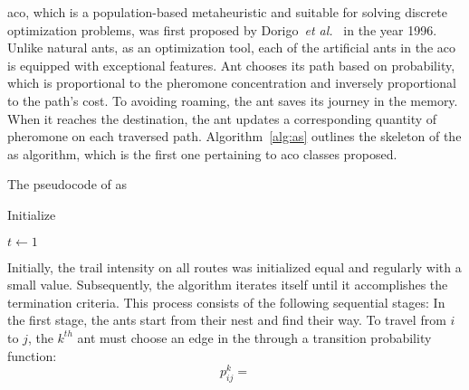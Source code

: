 \acrfull{aco}, which is a population-based metaheuristic and suitable for solving discrete optimization problems, was first proposed by Dorigo~\textit{et al.}~\cite{dorigo1996ant} in the year 1996. Unlike natural ants, as an optimization tool, each of the artificial ants in the \gls{aco} is equipped with exceptional features. Ant chooses its path based on probability, which is proportional to the pheromone concentration and inversely proportional to the path's cost. To avoiding roaming, the ant saves its journey in the memory. When it reaches the destination, the ant updates a corresponding quantity of pheromone on each traversed path. Algorithm~\ref{alg:as} outlines the skeleton of the \gls{as} algorithm, which is the first one pertaining to \gls{aco} classes proposed.

\begin{algorithm}
	\caption{The pseudocode of \gls{as}}
	\label{alg:as}
	\Begin
	{	
		Initialize\;
		
		$t \leftarrow 1$\;
		{
			
		}
	}
\end{algorithm}

Initially, the trail intensity on all routes was initialized equal and regularly with a small value. Subsequently, the algorithm iterates itself until it accomplishes the termination criteria. This process consists of the following sequential stages: In the first stage, the ants start from their nest and find their way. To travel from $i$ to $j$, the $k^{th}$ ant must choose an edge in the  through a transition probability function:
\begin{equation}
	\label{eq:aco_transition}
	p^k_{ij} =  
\end{equation}
